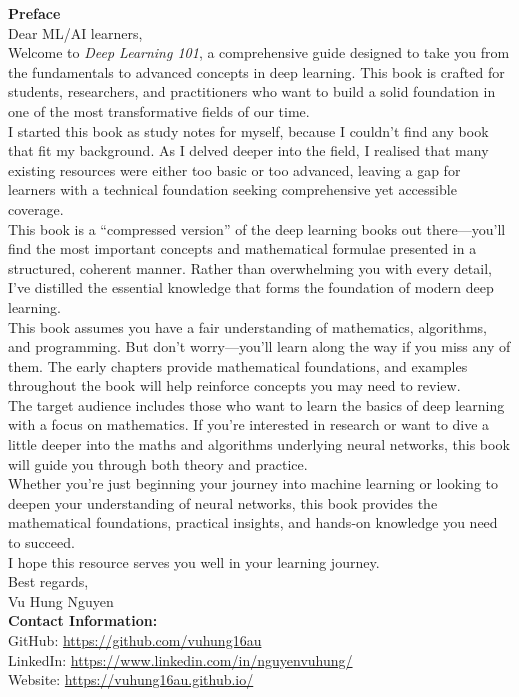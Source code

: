 \documentclass[10pt,\papersize,twoside,openright]{book}
\theoremstyle{definition}
\theoremstyle{remark}
\begin{document}
\newpage
\thispagestyle{empty}
\vspace*{\fill}
\begin{flushleft}
\textbf{Preface}\\[1em]

Dear ML/AI learners,\\[0.5em]

Welcome to \textit{Deep Learning 101}, a comprehensive guide designed to take you from the fundamentals to advanced concepts in deep learning. This book is crafted for students, researchers, and practitioners who want to build a solid foundation in one of the most transformative fields of our time.\\[0.5em]

I started this book as study notes for myself, because I couldn't find any book that fit my background. As I delved deeper into the field, I realised that many existing resources were either too basic or too advanced, leaving a gap for learners with a technical foundation seeking comprehensive yet accessible coverage.\\[0.5em]

This book is a ``compressed version'' of the deep learning books out there---you'll find the most important concepts and mathematical formulae presented in a structured, coherent manner. Rather than overwhelming you with every detail, I've distilled the essential knowledge that forms the foundation of modern deep learning.\\[0.5em]

This book assumes you have a fair understanding of mathematics, algorithms, and programming. But don't worry---you'll learn along the way if you miss any of them. The early chapters provide mathematical foundations, and examples throughout the book will help reinforce concepts you may need to review.\\[0.5em]

The target audience includes those who want to learn the basics of deep learning with a focus on mathematics. If you're interested in research or want to dive a little deeper into the maths and algorithms underlying neural networks, this book will guide you through both theory and practice.\\[0.5em]

Whether you're just beginning your journey into machine learning or looking to deepen your understanding of neural networks, this book provides the mathematical foundations, practical insights, and hands-on knowledge you need to succeed.\\[0.5em]

I hope this resource serves you well in your learning journey.\\[1em]

Best regards,\\
Vu Hung Nguyen\\[1em]

\textbf{Contact Information:}\\
GitHub: \url{https://github.com/vuhung16au}\\
LinkedIn: \url{https://www.linkedin.com/in/nguyenvuhung/}\\
Website: \url{https://vuhung16au.github.io/}
\end{flushleft}
\end{document}
